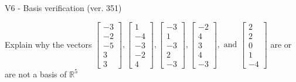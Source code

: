 \begin{exercise}
  \begin{exerciseTitle}V6 - Basis verification (ver. 351)\end{exerciseTitle}
  \begin{exerciseStatement}
    Explain why the vectors \(\left[\begin{array}{r}
-3 \\
-2 \\
-5 \\
3 \\
3
\end{array}\right] , \left[\begin{array}{r}
1 \\
-4 \\
-3 \\
-2 \\
4
\end{array}\right] , \left[\begin{array}{r}
-3 \\
1 \\
-3 \\
2 \\
-3
\end{array}\right] , \left[\begin{array}{r}
-2 \\
4 \\
3 \\
4 \\
-3
\end{array}\right] , \text{ and } \left[\begin{array}{r}
2 \\
2 \\
0 \\
1 \\
-4
\end{array}\right]\) are or are not a basis of \(\mathbb{R}^5\)	



\end{exerciseStatement}
\end{exercise}
